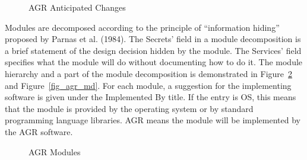 \begin{figure}[H]
    \centering
    \caption[AGR Anticipated Changes]{AGR Anticipated Changes}
    \label{fig_agr_ac}
\end{figure}

Modules are decomposed according to the principle of “information hiding” proposed by Parnas et al. (1984). The Secrets' field in a module decomposition is a brief statement of the design decision hidden by the module. The Services' field specifies what the module will do without documenting how to do it. The module hierarchy and a part of the module decomposition is demonstrated in Figure~\ref{fig_agr_modules} and Figure~\ref{fig_agr_md}. For each module, a suggestion for the implementing software is given under the Implemented By title. If the entry is OS, this means that the module is provided by the operating system or by standard programming language libraries. AGR means the module will be implemented by the AGR software.

\begin{figure}[H]
    \centering
    \caption[AGR Modules]{AGR Modules}
    \label{fig_agr_modules}
\end{figure}

